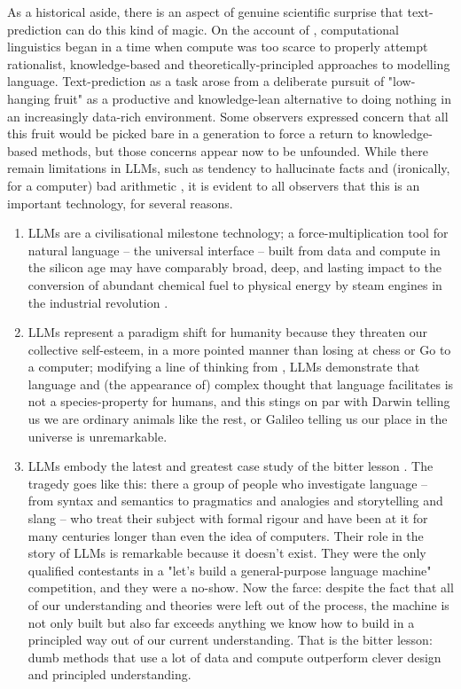 As a historical aside, there is an aspect of genuine scientific surprise that text-prediction can do this kind of magic. On the account of \citep{mcshane_linguistics_2021}, computational linguistics began in a time when compute was too scarce to properly attempt rationalist, knowledge-based and theoretically-principled approaches to modelling language. Text-prediction as a task arose from a deliberate pursuit of "low-hanging fruit" as a productive and knowledge-lean alternative to doing nothing in an increasingly data-rich environment. Some observers \citep{church_pendulum_2011} expressed concern that all this fruit would be picked bare in a generation to force a return to knowledge-based methods, but those concerns appear now to be unfounded. While there remain limitations in LLMs, such as tendency to hallucinate facts and (ironically, for a computer) bad arithmetic \citep{hendrycks_measuring_2021}, it is evident to all observers that this is an important technology, for several reasons.\\

\begin{enumerate}
\item{
LLMs are a civilisational milestone technology; a force-multiplication tool for natural language -- the universal interface \citep{} -- built from data and compute in the silicon age may have comparably broad, deep, and lasting impact to the conversion of abundant chemical fuel to physical energy by steam engines in the industrial revolution \citep{}.
}
\item{
LLMs represent a paradigm shift for humanity because they threaten our collective self-esteem, in a more pointed manner than losing at chess or Go to a computer; modifying a line of thinking from \citep{floridi_fourth_2014}, LLMs demonstrate that language and (the appearance of) complex thought that language facilitates is not a species-property for humans, and this stings on par with Darwin telling us we are ordinary animals like the rest, or Galileo telling us our place in the universe is unremarkable.
}
\item{
LLMs embody the latest and greatest case study of the bitter lesson \citep{sutton_bitter_2019}. The tragedy goes like this: there a group of people who investigate language -- from syntax and semantics to pragmatics and analogies and storytelling and slang -- who treat their subject with formal rigour and have been at it for many centuries longer than even the idea of computers. Their role in the story of LLMs is remarkable because it doesn't exist. They were the only qualified contestants in a "let's build a general-purpose language machine" competition, and they were a no-show. Now the farce: despite the fact that all of our understanding and theories were left out of the process, the machine is not only built but also far exceeds anything we know how to build in a principled way out of our current understanding. That is the bitter lesson: dumb methods that use a lot of data and compute outperform clever design and principled understanding.
}
\end{enumerate}


